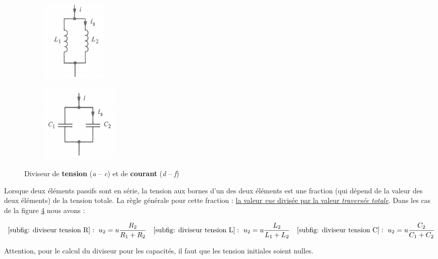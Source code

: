\documentclass[12pt,a4paper]{article}
\begin{document}
\begin{figure}
\begin{subfigure}[b]{0.3\textwidth}
		\caption{}
		\label{subfig: diviseur courant R}
	\end{subfigure}
		\begin{subfigure}[b]{0.3\textwidth}
		\centering
		\includegraphics[scale=0.8]{images/diviseur_courant_l}
		\caption{}
		\label{subfig: diviseur courant L}
	\end{subfigure}
		\begin{subfigure}[b]{0.3\textwidth}
		\centering
		\includegraphics[scale=0.8]{images/diviseur_courant_c}
		\caption{}
		\label{subfig: diviseur courant C}
	\end{subfigure}
	\caption{Diviseur de \textbf{tension} (\textit{a} -- \textit{c}) et de \textbf{courant} (\textit{d} -- \textit{f})}
	\label{figs: diviseur tension courant}
\end{figure}
 Lorsque deux éléments passifs sont en série, la tension aux bornes d'un des deux éléments est une fraction (qui dépend de la valeur des deux éléments) de la tension totale. La règle générale pour cette fraction : \uline{la valeur \textit{vue} divisée par la valeur \textit{traversée totale}}. Dans les cas de la figure \ref{figs: diviseur tension courant} nous avons :
\begin{boite}
	\begin{equation}
		\ref{subfig: diviseur tension R}:\ u_2 = u\frac{R_2}{R_1 + R_2} \quad \ref{subfig: diviseur tension L} :\ u_2 = u\frac{L_2}{L_1 + L_2} \quad \ref{subfig: diviseur tension C} :\ u_2 = u\frac{C_2}{C_1 + C_2}
	\end{equation}
\end{boite}
Attention, pour le calcul du diviseur pour les capacités, il faut que les tension initiales soient nulles.\\
\end{document}
